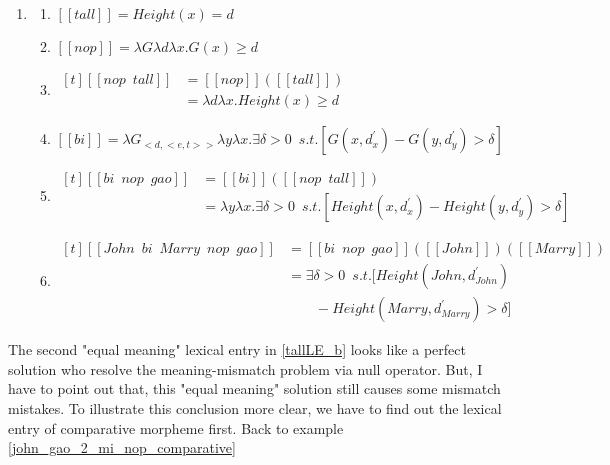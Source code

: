 \documentclass{ctexart}
\begin{document}
\begin{enumerate}[resume]
    \item \label{john_gao_2_mi_nop_comparative_LE}
    \begin{enumerate}[ref=(\arabic{enumi}\alph*)]
        \item $[\![tall]\!]=Height(x)=d$
        \item $[\![nop]\!]=\lambda G\lambda d \lambda x.G(x) \geq d$
        \item 
        $\begin{aligned}[t]
            [\![nop \enspace tall]\!] &= [\![nop]\!]([\![tall]\!]) \\
            &= \lambda d \lambda x.Height(x) \geq d
        \end{aligned}$ \label{john_gao_2_mi_nop_comparative_LE_bi}
        \item $[\![bi]\!]= \lambda G_{<d,<e,t>>} \lambda y \lambda x . \exists \delta > 0 \enspace s.t.[G(x,d_x^{\prime}) - G(y,d_y^{\prime})>\delta]$
        \item
        $\begin{aligned}[t]
            [\![bi \enspace nop \enspace gao]\!] &= [\![bi]\!]([\![nop \enspace tall]\!]) \\
            &= \lambda y \lambda x . \exists \delta > 0 \enspace s.t.[Height(x,d_x^{\prime}) - Height(y,d_y^{\prime})>\delta]
        \end{aligned}$
        \item
        $\begin{aligned}[t]
            [\![John \enspace bi \enspace Marry \enspace nop \enspace gao]\!] 
            &= [\![bi \enspace nop \enspace gao]\!]([\![John]\!])([\![Marry]\!]) \\
            &= \exists \delta > 0 \enspace s.t.[Height(John,d_{John}^{\prime}) \\ 
            & \qquad - Height(Marry,d_{Marry}^{\prime})>\delta]
        \end{aligned}$
    \end{enumerate}
\end{enumerate}

The second "equal meaning" lexical entry in \ref{tallLE_b} looks like a perfect solution who resolve the meaning-mismatch problem via null operator. But, I have to point out that, this "equal meaning" solution still causes some mismatch mistakes. To illustrate this conclusion more clear, we have to find out the lexical entry of comparative morpheme first. Back to example \ref{john_gao_2_mi_nop_comparative}
\end{document}
